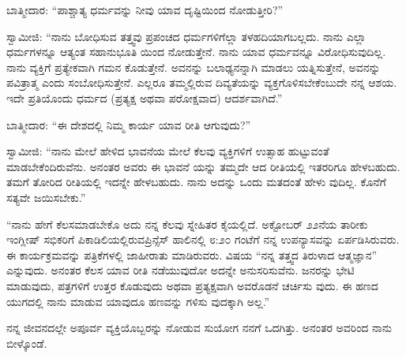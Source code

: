ಬಾತ್ಮೀದಾರ: “ಪಾಶ್ಚಾತ್ಯ ಧರ್ಮವನ್ನು ನೀವು ಯಾವ ದೃಷ್ಟಿಯಿಂದ ನೋಡುತ್ತೀರಿ?”

ಸ್ವಾಮೀಜಿ: “ನಾನು ಬೋಧಿಸುವ ತತ್ತ್ವವು ಪ್ರಪಂಚದ ಧರ್ಮಗಳಿಗೆಲ್ಲಾ ತಳಹದಿಯಾಗಬಲ್ಲದು. ನಾನು ಎಲ್ಲಾ ಧರ್ಮಗಳನ್ನೂ ಆತ್ಯಂತ ಸಹಾನುಭೂತಿ ಯಿಂದ ನೋಡುತ್ತೇನೆ. ನಾನು ಯಾವ ಧರ್ಮವನ್ನೂ ವಿರೋಧಿಸುವುದಿಲ್ಲ. ನಾನು ವ್ಯಕ್ತಿಗೆ ಪ್ರತ್ಯೇಕವಾಗಿ ಗಮನ ಕೊಡುತ್ತೇನೆ. ಅವನನ್ನು ಬಲಾಢ್ಯನನ್ನಾಗಿ ಮಾಡಲು ಯತ್ನಿಸುತ್ತೇನೆ, ಅವನನ್ನು ಪವಿತ್ರಾತ್ಮ ಎಂದು ಸಂಬೋಧಿಸುತ್ತೇನೆ. ಎಲ್ಲರೂ ತಮ್ಮಲ್ಲಿರುವ ದಿವ್ಯತೆಯನ್ನು ವ್ಯಕ್ತಗೊಳಿಸಬೇಕೆಂಬುದೇ ನನ್ನ ಆಶಯ. ಇದೇ ಪ್ರತಿಯೊಂದು ಧರ್ಮದ (ಪ್ರತ್ಯಕ್ಷ ಅಥವಾ ಪರೋಕ್ಷವಾದ) ಆದರ್ಶವಾಗಿದೆ.”

ಬಾತ್ಮೀದಾರ: “ಈ ದೇಶದಲ್ಲಿ ನಿಮ್ಮ ಕಾರ್ಯ ಯಾವ ರೀತಿ ಆಗುವುದು?”

ಸ್ವಾಮೀಜಿ: “ನಾನು ಮೇಲೆ ಹೇಳಿದ ಭಾವನೆಯ ಮೇಲೆ ಕೆಲವು ವ್ಯಕ್ತಿಗಳಿಗೆ ಉತ್ಸಾಹ ಹುಟ್ಟುವಂತೆ ಮಾಡಬೇಕೆಂದಿರುವೆನು. ಅನಂತರ ಅವರು ಈ ಭಾವನೆ ಯನ್ನು ತಮ್ಮದೇ ಆದ ರೀತಿಯಲ್ಲಿ ಇತರರಿಗೂ ಹೇಳಬಹುದು. ತಮಗೆ ತೋರಿದ ರೀತಿಯಲ್ಲಿ ಇದನ್ನೇ ಹೇಳಬಹುದು. ನಾನು ಅದನ್ನು ಒಂದು ಮತದಂತೆ ಹೇಳು ವುದಿಲ್ಲ. ಕೊನೆಗೆ ಸತ್ಯವೇ ಜಯಿಸಬೇಕು.”

“ನಾನು ಹೇಗೆ ಕೆಲಸಮಾಡಬೇಕೊ ಅದು ನನ್ನ ಕೆಲವು ಸ್ನೇಹಿತರ ಕೈಯಲ್ಲಿದೆ. ಅಕ್ಟೋಬರ್​ ೨೨ನೆಯ ತಾರೀಕು ಇಂಗ್ಲೀಷ್​ ಸಭಿಕರಿಗೆ ಪಿಕಾಡಿಲಿಯಲ್ಲಿರುವಪ್ರಿನ್ಸೆಸ್​ ಹಾಲಿನಲ್ಲಿ ೮:೨೦ ಗಂಟೆಗೆ ನನ್ನ ಉಪನ್ಯಾಸವನ್ನು ಏರ್ಪಡಿಸಿರುವರು. ಈ ಕಾರ್ಯಕ್ರಮವನ್ನು ಪತ್ರಿಕೆಗಳಲ್ಲಿ ಜಾಹೀರಾತು ಮಾಡಿರುವರು. ವಿಷಯ “ನನ್ನ ತತ್ತ್ವದ ತಿರುಳಾದ ಆತ್ಮಜ್ಞಾನ” ಎನ್ನುವುದು. ಅನಂತರ ಕೆಲಸ ಯಾವ ರೀತಿ ನಡೆಯುವುದೋ ಅದನ್ನೇ ಅನುಸರಿಸುವೆನು. ಜನರನ್ನು ಭೇಟಿ ಮಾಡುವುದು, ಪತ್ರಗಳಿಗೆ ಉತ್ತರ ಕೊಡುವುದು ಅಥವಾ ಪ್ರತ್ಯಕ್ಷವಾಗಿ ಅವರೊಡನೆ ಚರ್ಚಿಸು ವುದು. ಈ ಹಣದ ಯುಗದಲ್ಲಿ ನಾನು ಮಾಡುವ ಯಾವುದೂ ಹಣವನ್ನು ಗಳಿಸು ವುದಕ್ಕಾಗಿ ಅಲ್ಲ.”

ನನ್ನ ಜೀವನದಲ್ಲೇ ಅಪೂರ್ವ ವ್ಯಕ್ತಿಯೊಬ್ಬರನ್ನು ನೋಡುವ ಸುಯೋಗ ನನಗೆ ಒದಗಿತ್ತು. ಅನಂತರ ಅವರಿಂದ ನಾನು ಬೀಳ್ಕೊಂಡೆ.

